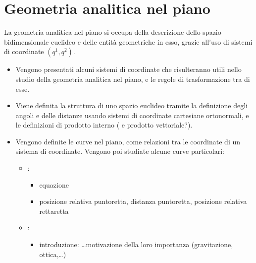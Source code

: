 \documentclass[letterpaper,10pt,english]{jupyterBook}
\begin{document}
\chapter{Geometria analitica nel piano}
\label{\detokenize{ch/analytic_geometry/analytic_geometry_2d:geometria-analitica-nel-piano}}\label{\detokenize{ch/analytic_geometry/analytic_geometry_2d:geometry-analytic-2d}}\label{\detokenize{ch/analytic_geometry/analytic_geometry_2d::doc}}
\sphinxAtStartPar
La geometria analitica nel piano si occupa della descrizione dello spazio bidimensionale euclideo e delle entità geometriche in esso, grazie all’uso di sistemi di coordinate \((q^1, q^2)\).
\begin{itemize}
\item {} 
\sphinxAtStartPar
{} Vengono presentati alcuni sistemi di coordinate che risulteranno utili nello studio della geometria analitica nel piano, e le regole di trasformazione tra di esse.

\item {} 
\sphinxAtStartPar
{} Viene definita la struttura di uno spazio euclideo tramite la definizione degli angoli e delle distanze usando sistemi di coordinate cartesiane ortonormali, e le definizioni di prodotto interno ( e prodotto vettoriale?).

\item {} 
\sphinxAtStartPar
{} Vengono definite le curve nel piano, come relazioni tra le coordinate di un sistema di coordinate.   Vengono poi studiate alcune curve particolari:
\begin{itemize}
\item {} 
\sphinxAtStartPar
{}:
\begin{itemize}
\item {} 
\sphinxAtStartPar
equazione

\item {} 
\sphinxAtStartPar
posizione relativa punto\sphinxhyphen{}retta, distanza punto\sphinxhyphen{}retta, posizione relativa retta\sphinxhyphen{}retta

\end{itemize}

\item {} 
\sphinxAtStartPar
{}:
\begin{itemize}
\item {} 
\sphinxAtStartPar
introduzione: …motivazione della loro importanza (gravitazione, ottica,…)


\end{itemize}
\end{itemize}
\end{itemize}
\end{document}
